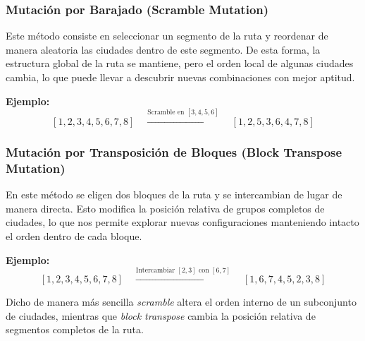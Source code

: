 \subsubsection{Mutación por Barajado (Scramble Mutation)}
Este método consiste en seleccionar un segmento de la ruta y reordenar de manera aleatoria las ciudades dentro de este segmento. 
De esta forma, la estructura global de la ruta se mantiene, pero el orden local de algunas ciudades cambia, lo que puede llevar 
a descubrir nuevas combinaciones con mejor aptitud. 

\textbf{Ejemplo:}
\[
[1,2,3,4,5,6,7,8] \quad \xrightarrow{\text{Scramble en } [3,4,5,6]} \quad [1,2,5,3,6,4,7,8]
\]

\subsubsection{Mutación por Transposición de Bloques (Block Transpose Mutation)}
En este método se eligen dos bloques de la ruta y se intercambian de lugar de manera directa. 
Esto modifica la posición relativa de grupos completos de ciudades, lo que nos permite explorar nuevas configuraciones manteniendo intacto 
el orden dentro de cada bloque.

\textbf{Ejemplo:}
\[
[1,2,3,4,5,6,7,8] \quad \xrightarrow{\text{Intercambiar } [2,3] \text{ con } [6,7]} \quad [1,6,7,4,5,2,3,8]
\]

\bigskip
Dicho de manera más sencilla \textit{scramble} altera el orden interno de un subconjunto de ciudades,
mientras que \textit{block transpose} cambia la posición relativa de segmentos completos de la ruta.

